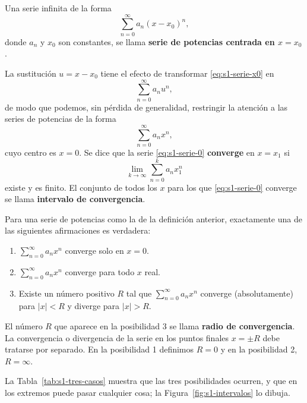  \begin{definition}
     Una serie infinita de la forma
\begin{equation}
\sum_{n=0}^{\infty} a_n(x - x_0)^n,
\label{eq:s1-serie-x0}
\end{equation}
donde $a_n$ y $x_0$ son constantes, se llama \textbf{serie de potencias centrada en $x = x_0$}.
 
\vspace{0.3cm}
 
La sustitución $u = x - x_0$ tiene el efecto de transformar \eqref{eq:s1-serie-x0} en
\[ \sum_{n=0}^{\infty} a_n u^n, \]
de modo que podemos, sin pérdida de generalidad, restringir la atención a las series de potencias de la forma
\begin{equation}
\sum_{n=0}^{\infty} a_n x^n,
\label{eq:s1-serie-0}
\end{equation}
cuyo centro es $x = 0$. Se dice que la serie \eqref{eq:s1-serie-0} \textbf{converge} en $x = x_1$ si
\[ \lim_{k \to \infty} \sum_{n=0}^{k} a_n x_1^n \]
existe y es finito. El conjunto de todos los $x$ para los que \eqref{eq:s1-serie-0} converge se llama \textbf{intervalo de convergencia}.
 \end{definition}
 
 \begin{theorem}
     Para una serie de potencias como la de la definición anterior, exactamente una de las siguientes afirmaciones es verdadera:
\begin{enumerate}
    \item $\sum_{n=0}^{\infty} a_n x^n$ converge solo en $x = 0$.
    \item $\sum_{n=0}^{\infty} a_n x^n$ converge para todo $x$ real.
    \item Existe un número positivo $R$ tal que $\sum_{n=0}^{\infty} a_n x^n$ converge (absolutamente) para $|x| < R$ y diverge para $|x| > R$.
\end{enumerate}
 \end{theorem}
 
 \begin{remark}
     El número $R$ que aparece en la posibilidad 3 se llama \textbf{radio de convergencia}. La convergencia o divergencia de la serie en los puntos finales $x = \pm R$ debe tratarse por separado. En la posibilidad 1 definimos $R=0$ y en la posibilidad 2, $R = \infty$.
 \end{remark}
 
La Tabla~\ref{tab:s1-tres-casos} muestra que las tres posibilidades ocurren, y que en los extremos puede pasar cualquier cosa; la Figura~\ref{fig:s1-intervalos} lo dibuja.
 
